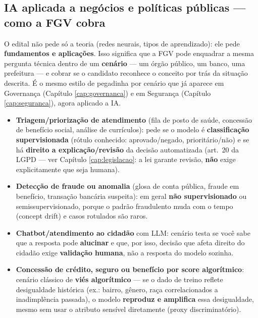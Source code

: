 \subsection{IA aplicada a negócios e políticas públicas --- como a FGV cobra}

O edital não pede só a teoria (redes neurais, tipos de aprendizado): ele pede
\textbf{fundamentos e aplicações}. Isso significa que a FGV pode enquadrar a
mesma pergunta técnica dentro de um \textbf{cenário} --- um órgão público, um
banco, uma prefeitura --- e cobrar se o candidato reconhece o conceito por
trás da situação descrita. É o mesmo estilo de pegadinha por cenário que já
aparece em Governança (Capítulo \ref{cap:governanca}) e em Segurança
(Capítulo \ref{cap:seguranca}), agora aplicado a IA.

\begin{conceito}
\begin{itemize}
\item \textbf{Triagem/priorização de atendimento} (fila de posto de saúde,
concessão de benefício social, análise de currículos): pede se o modelo é
\textbf{classificação supervisionada} (rótulo conhecido: aprovado/negado,
prioritário/não) e se há \textbf{direito a explicação/revisão} da decisão
automatizada (art.\ 20 da LGPD --- ver Capítulo \ref{cap:legislacao}: a lei
garante revisão, \textbf{não} exige explicitamente que seja humana).
\item \textbf{Detecção de fraude ou anomalia} (glosa de conta pública,
fraude em benefício, transação bancária suspeita): em geral
\textbf{não supervisionado} ou semissupervisionado, porque o padrão fraudulento
muda com o tempo (concept drift) e casos rotulados são raros.
\item \textbf{Chatbot/atendimento ao cidadão} com LLM: cenário testa se você
sabe que a resposta pode \textbf{alucinar} e que, por isso, decisão que afeta
direito do cidadão exige \textbf{validação humana}, não a resposta do modelo
sozinha.
\item \textbf{Concessão de crédito, seguro ou benefício por score
algorítmico}: cenário clássico de \textbf{viés algorítmico} --- se o dado de
treino reflete desigualdade histórica (ex.: bairro, gênero, raça
correlacionados a inadimplência passada), o modelo \textbf{reproduz e
amplifica} essa desigualdade, mesmo sem usar o atributo sensível diretamente
(proxy discriminatório).
\end{itemize}
\end{conceito}

